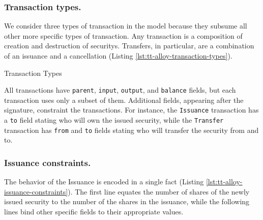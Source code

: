 
\subsubsection{Transaction types.}

We consider three types of transaction in the model because they subsume all other more specific types of transaction. Any transaction is a composition of creation and destruction of  \glspl{security}.  Transfers, in particular, are a combination of an issuance and a cancellation (Listing \ref{lst:tt-alloy-transaction-types}).

\begin{listing}[!h]
	\caption{Transaction Types}
\label{lst:tt-alloy-transaction-types}
\end{listing}

All \glspl{transaction} have \verb|parent|, \verb|input|, \verb|output|, and \verb|balance| fields, but each transaction uses only a subset of them. Additional fields, appearing after the signature, constraint the \glspl{transaction}.
%
For instance, the \verb|Issuance| transaction has a \verb|to| field stating who will own the issued security, while the \verb|Transfer| transaction has \verb|from| and \verb|to| fields stating who will transfer the \gls{security} from and to.

\subsubsection{Issuance constraints.}

The behavior of the Issuance is encoded in a single fact (Listing \ref{lst:tt-alloy-issuance-constraints}). The first line equates the number of shares of the newly issued \gls{security} to the number of the shares in the issuance, while the following lines bind other specific fields to their appropriate values.

